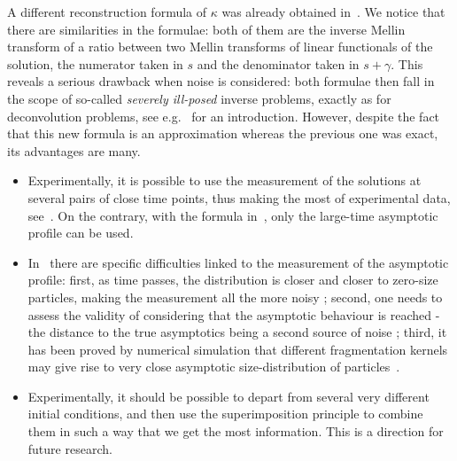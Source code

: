 \documentclass[10pt]{amsart}
\theoremstyle{definition}\newtheorem{defi}[theo]{Definition}\newtheorem{rema}[theo]{Remark}\newtheorem{exam}[theo]{Example}\newtheorem{exem}[theo]{Example}\newtheorem{nota}[theo]{Notation}
\begin{document}
A different reconstruction formula of $\kappa $ was already obtained in~\cite[Theorem~2, (iii)]{DET18}. We notice that there are similarities in the formulae: both of them are the inverse Mellin transform of a ratio between two Mellin transforms of linear functionals of the solution, the numerator taken in $s$ and the denominator taken in $s+\gamma.$ This reveals a serious drawback when noise is considered: both formulae then fall in the scope of so-called \emph{severely ill-posed} inverse problems, exactly as for deconvolution problems, see e.g.~\cite[Chapter~4]{Baumeister_book} for an introduction. However, despite the fact that this new formula is an approximation whereas the previous one was exact, its advantages are many.
\begin{itemize}
\item Experimentally, it is possible to use the measurement of the solutions at several pairs of close time points, thus making the most of experimental data, see~\cite{BTMPSTDX19}. On the contrary, with the formula in~\cite{DET18}, only the large-time asymptotic profile can be used.
\item In~\cite{DET18} there are specific difficulties linked to the measurement of the asymptotic profile: first, as time passes, the distribution is closer and closer to zero-size particles, making the measurement all the more noisy ; second, one needs to assess the validity of considering that the asymptotic behaviour is reached - the distance to the true asymptotics being a second source of noise ; third, it has been proved by numerical simulation that different fragmentation kernels may give rise to very close asymptotic size-distribution of particles~\cite{DETX20}.
\item Experimentally, it should be possible to depart from several very different initial conditions, and then use the superimposition principle to combine them in such a way that we get the most information. This is a direction for future research.
\end{itemize}
\end{document}
